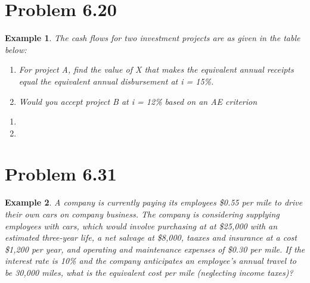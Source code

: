 \documentclass{report} %
\newtheorem{exmp}{Example}
\begin{document}
\section*{Problem 6.20}
\begin{exmp}
    The cash flows for two investment projects are as given in the table below:
    \begin{enumerate}
        \item For project A, find the value of X that makes the equivalent annual receipts equal the equivalent annual disbursement at i = 15\%.
        \item Would you accept project B at i = 12\% based on an AE criterion
    \end{enumerate}
\end{exmp}
\begin{enumerate}
    \item {}
    \item {}
\end{enumerate}
\section*{Problem 6.31}
\begin{exmp}
    A company is currently paying its employees \$0.55 per mile to drive their own cars on company business. The company is considering supplying employees with cars, which would involve purchasing at at \$25,000 with an estimated three-year life, a net salvage at \$8,000, taaxes and insurance at a cost \$1,200 per year, and operating and maintenance expenses of \$0.30 per mile. If the interest rate is 10\% and the company anticipates an employee's annual travel to be 30,000 miles, what is the equivalent cost per mile (neglecting income taxes)?
\end{exmp}
\begin{center}
\end{center}
\end{document}
